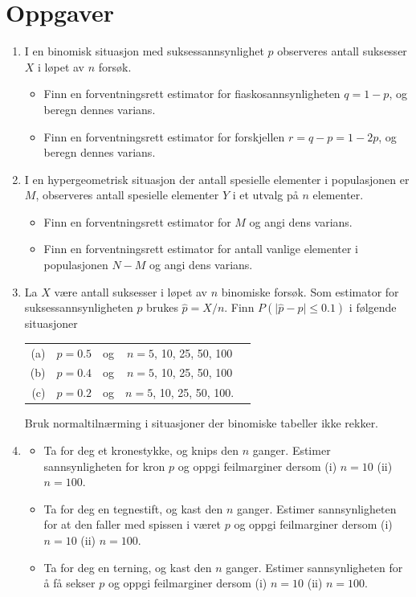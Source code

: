 \section{Oppgaver}
\small
\begin{enumerate}
\item I en binomisk situasjon med suksessannsynlighet $p$
    observeres antall suksesser $X$ i løpet av $n$ forsøk.
\begin{itemize}
\item[(a)] Finn en forventningsrett estimator for
   fiaskosannsynligheten $q=1-p$, og beregn dennes varians.
 
\item[(b)] Finn en forventningsrett estimator for forskjellen
            $r=q-p=1-2p$, og beregn dennes varians.
\end{itemize}

\item I en hypergeometrisk situasjon der antall spesielle
elementer i populasjonen er $M$, observeres antall spesielle
elementer $Y$ i et utvalg på $n$ elementer.
\begin{itemize}
\item[(a)] Finn en forventningsrett estimator for $M$ og angi dens
   varians.
\item[(b)] Finn en forventningsrett estimator for antall vanlige elementer i populasjonen $N-M$ og angi dens varians.
\end{itemize}

\item La $X$ være antall suksesser i løpet av $n$ binomiske
forsøk. Som estimator for suksessannsynligheten $p$ brukes
$\hat p=X/n$. Finn $P(\mid\hat p-p\mid\leq 0.1)$ i følgende
situasjoner
\begin{center}
\begin{tabular}{rrccl}
(a)& $p=0.5$ & og & $n=5$, 10, 25, 50, 100 \\
(b)& $p=0.4$ & og & $n=5$, 10, 25, 50, 100 \\
(c)& $p=0.2$ & og & $n=5$, 10, 25, 50, 100.
\end{tabular}
\end{center}
Bruk normaltilnærming i situasjoner der binomiske tabeller ikke rekker.
\item
\begin{itemize}
\item[(a)] Ta for deg et kronestykke, og knips den $n$ ganger.
   Estimer sannsynligheten for kron $p$ og oppgi
    feilmarginer dersom (i) $n=10$   (ii) $n=100$.
\item[(b)] Ta for deg en tegnestift, og kast den $n$ ganger.
    Estimer sannsynligheten for at den faller med spissen i
    været $p$ og oppgi feilmarginer dersom (i) $n=10$  (ii) $n=100$.
\item[(c)] Ta for deg en terning, og kast den $n$ ganger. Estimer
   sannsynligheten for å få sekser $p$ og oppgi
    feilmarginer dersom (i) $n=10$  (ii) $n=100$.
\end{itemize}


\end{enumerate}
